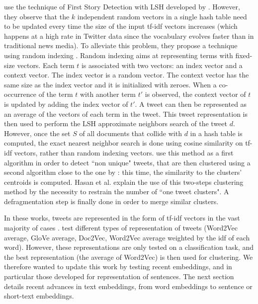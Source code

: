 \citet{hasan_twitternews_2016} use the technique of First Story Detection with LSH developed by \citet{petrovic_streaming_2010}. However, they observe that the $k$ independent random vectors in a single hash table need to be updated every time the size of the input tf-idf vectors increases (which happens at a high rate in Twitter data since the vocabulary evolves faster than in traditional news media). To alleviate this problem, they propose a technique using random indexing \citep{sahlgren_introduction_2005}. Random indexing  aims at representing terms with fixed-size vectors. Each term $t$ is associated with two vectors: an index vector and a context vector. The index vector is a random vector. The context vector has the same size as the index vector and it is initialized with zeroes. When a co-occurrence of the term $t$ with another term $t'$ is observed, the context vector of $t$ is updated by adding the index vector of $t'$. A tweet can then be represented as an average of the vectors of each term in the tweet. This tweet representation is then used to perform the LSH approximate neighbors search of the tweet $d$. However, once the set $S$ of all documents that collide with $d$ in a hash table is computed, the exact nearest neighbor search is done using cosine similarity on tf-idf vectors, rather than random indexing vectors. \citet{hasan_twitternews_2016} use this method as a first algorithm in order to detect ``non unique" tweets, that are then clustered using a second algorithm close to the one by \citet{sankaranarayanan_twitterstand:_2009}: this time, the similarity to the clusters' centroids is computed. Hasan et al. explain the use of this two-steps clustering method by the necessity to restrain the number of ``one tweet clusters". A defragmentation step is finally done in order to merge similar clusters.


In these works, tweets are represented in the form of tf-idf vectors in the vast majority of cases \citep{sankaranarayanan_twitterstand:_2009, petrovic_streaming_2010, becker_automatic_2011, hasan_twitternews_2016}. \citet{repp_extracting_2018} test different types of representation of tweets (Word2Vec average, GloVe average, Doc2Vec, Word2Vec average weighted by the idf of each word). However, these representations are only tested on a classification task, and the best representation (the average of Word2Vec) is then used for clustering. We therefore wanted to update this work by testing recent embeddings, and in particular those developed for representation of sentences. The next section details recent advances in text embeddings, from word embeddings to sentence or short-text embeddings.

